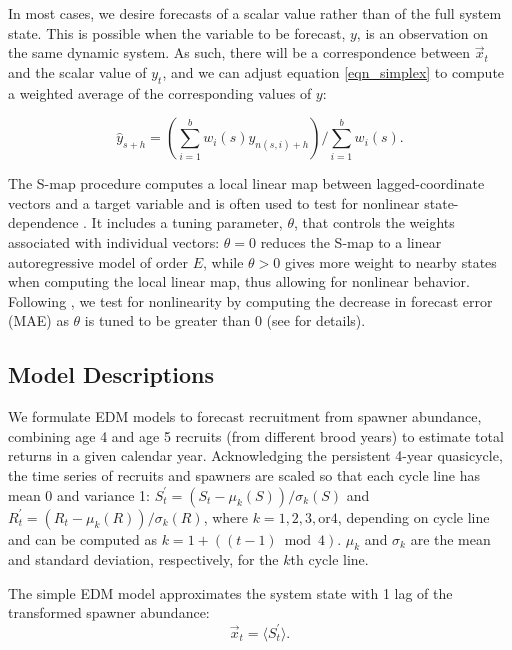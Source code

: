 In most cases, we desire forecasts of a scalar value rather than of the full system state. This is possible when the variable to be forecast, $y$, is an observation on the same dynamic system. As such, there will be a correspondence between $\vec{x}_t$ and the scalar value of $y_t$, and we can adjust equation \ref{eqn_simplex} to compute a weighted average of the corresponding values of $y$:

\begin{equation}
\label{eqn_simplex_scalar}
\hat{y}_{s+h} = \left(\sum_{i=1}^{b}{w_i\left(s\right)y_{n(s, i)+h}}\right) \bigg/ \sum_{i=1}^{b}{w_i\left(s\right)}.
\end{equation}

The S-map procedure computes a local linear map between lagged-coordinate vectors and a target variable and is often used to test for nonlinear state-dependence \cite{Sugihara_1994}. It includes a tuning parameter, $\theta$, that controls the weights associated with individual vectors: $\theta = 0$ reduces the S-map to a linear autoregressive model of order $E$, while $\theta > 0$ gives more weight to nearby states when computing the local linear map, thus allowing for nonlinear behavior. Following \cite{Glaser_2014a, Hsieh_2006}, we test for nonlinearity by computing the decrease in forecast error (MAE) as $\theta$ is tuned to be greater than 0 (see  for details).

\subsection{Model Descriptions}

We formulate EDM models to forecast recruitment from spawner abundance, combining age 4 and age 5 recruits (from different brood years) to estimate total returns in a given calendar year. Acknowledging the persistent 4-year quasicycle, the time series of recruits and spawners are scaled so that each cycle line has mean 0 and variance 1: $S^\prime_t = \left(S_t - \mu_k(S)\right)/\sigma_k(S)$ and $R^\prime_t = \left(R_t - \mu_k(R)\right)/\sigma_k(R)$, where $k = 1, 2, 3, \mathrm{or } 4$, depending on cycle line and can be computed as $k = 1 + ((t-1) \bmod 4)$. $\mu_k$ and $\sigma_k$ are the mean and standard deviation, respectively, for the $k$th cycle line.

The simple EDM model approximates the system state with 1 lag of the transformed spawner abundance:
\begin{equation}
\vec{x}_t = \langle S^\prime_t \rangle.
\end{equation}

